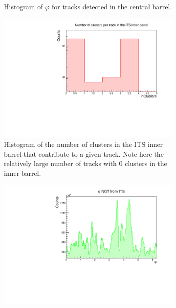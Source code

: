\begin{figure}[h]
\begin{subfigure}[t]{.49\linewidth}
        \caption{Histogram of $\varphi$ for tracks detected in the central barrel.}
        \label{fig:nohasITS_phi}
    \end{subfigure}
    \begin{subfigure}[t]{.49\linewidth}
        \centering
        \includegraphics[width=\linewidth]{Plots/pass4_TracksIU_nohasITS/itsNClsInnerBarrel.pdf}
        \caption{Histogram of the number of clusters in the ITS inner barrel that contribute to a given track. Note here the relatively large number of tracks with 0 clusters in the inner barrel.}
        \label{fig:nohasITS_NCls_InnerBarrel}
    \end{subfigure}
    \hfill 
    \begin{subfigure}[t]{.49\linewidth}
        \centering
        \includegraphics[width=\linewidth]{Plots/phi_no_ITS.pdf}

\end{subfigure}
\end{figure}
